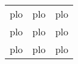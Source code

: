 \documentclass[a4paper,10pt]{article}
\begin{document}
\begin{tabular}{ccc}
	plo & plo & plo \\
	\Xhline{5\arrayrulewidth}
	plo & plo & plo \\
	\hline
	plo & plo & plo
\end{tabular}
\end{document}
